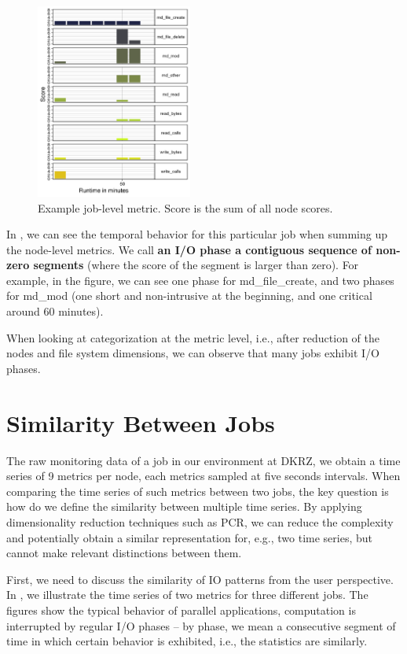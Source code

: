 \documentclass[]{llncs}
\begin{document}
\begin{figure}[!bt]
	\centering
	\includegraphics[width=2.02in,height=2.52in]{./media/image4.png}
	\caption{Example job-level metric. Score is the sum of all node scores.}
	\label{fig:seg_example}
\end{figure}

In , we can see the temporal behavior for this particular job when summing up the node-level metrics.
We call \textbf{an I/O phase a contiguous sequence of non-zero segments} (where the score of the segment is larger than zero).
For example, in the figure, we can see one phase for md\_file\_create, and two phases for md\_mod (one short and non-intrusive at the beginning, and one critical around 60 minutes).

When looking at categorization at the metric level, i.e., after reduction of the nodes and file system dimensions, we can observe that many jobs exhibit I/O phases. 

\section{Similarity Between Jobs}
The raw monitoring data of a job in our environment at DKRZ, we obtain a time series of 9 metrics per node, each metrics sampled at five seconds intervals.
When comparing the time series of such metrics between two jobs, the key question is how do we define the similarity between multiple time series.
By applying dimensionality reduction techniques such as PCR, we can reduce the complexity and potentially obtain a similar representation for, e.g., two time series, but cannot make relevant distinctions between them.

First, we need to discuss the similarity of IO patterns from the user perspective.
In , we illustrate the time series of two metrics for three different jobs.
The figures show the typical behavior of parallel applications, computation is interrupted by regular I/O phases -- by phase, we mean a consecutive segment of time in which  certain behavior is exhibited, i.e., the statistics are similarly.
\end{document}
